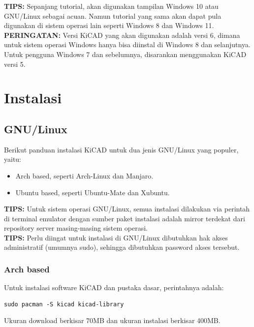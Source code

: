 \documentclass[12pt]{book}
\begin{document}
	\textbf{TIPS:} Sepanjang tutorial, akan digunakan tampilan Windows 10 atau GNU/Linux sebagai acuan.
	Namun tutorial yang sama akan dapat pula digunakan di sistem operasi lain seperti Windows 8 dan Windows 11.\\

	\textbf{PERINGATAN:} Versi KiCAD yang akan digunakan adalah versi 6, dimana untuk sistem operasi Windows
	hanya bisa diinstal di Windows 8 dan selanjutnya.
	Untuk pengguna Windows 7 dan sebelumnya, disarankan menggunakan KiCAD versi 5.

	\newpage
	\section{Instalasi}

	\subsection{GNU/Linux}

	Berikut panduan instalasi KiCAD untuk dua jenis GNU/Linux yang populer, yaitu:
	\begin{itemize}
		\item Arch based, seperti Arch-Linux dan Manjaro.
		\item Ubuntu based, seperti Ubuntu-Mate dan Xubuntu.
	\end{itemize}

	\textbf{TIPS:} Untuk sistem operasi GNU/Linux, semua instalasi dilakukan via perintah di
	terminal emulator dengan sumber paket instalasi adalah mirror terdekat dari repository server masing-masing sistem operasi.\\

	\textbf{TIPS:} Perlu diingat untuk instalasi di GNU/Linux dibutuhkan hak akses administratif (umumnya sudo),
	sehingga dibutuhkan password akses tersebut.

	\subsubsection{Arch based}

	Untuk instalasi software KiCAD dan pustaka dasar, perintahnya adalah:

	\begin{lstlisting}
sudo pacman -S kicad kicad-library
	\end{lstlisting}

	Ukuran download berkisar 70MB dan ukuran instalasi berkisar 400MB.\\
\end{document}
